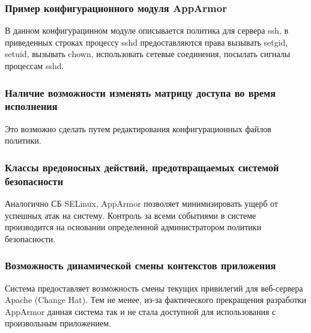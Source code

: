 \subsubsection{Пример конфигурационного модуля AppArmor}


В данном конфигурацинном модуле описывается политика
для сервера ssh, в приведенных строках процессу sshd
предоставляются права вызывать setgid, setuid, вызывать
chown, использовать сетевые соединения, посылать сигналы
процессам sshd.



\subsubsection{Наличие возможности изменять матрицу доступа 
	во время исполнения} 

Это возможно сделать путем редактирования конфигурационных
файлов политики. 


\subsubsection{Классы вредоносных действий, предотвращаемых
	системой безопасности} 

Аналогично СБ SELinux, AppArmor позволяет 
минимизировать ущерб от успешных атак на систему. 
Контроль за всеми событиями в системе производится 
на основании определенной администратором политики 
безопасности. 

\subsubsection{Возможность динамической смены 
контекстов приложения} 

Система предоставляет возможность смены
текущих привилегий для веб-сервера Apache
(Change Hat). Тем не менее, из-за фактического
прекращения разработки AppArmor данная 
система так и не стала доступной для использования
с произвольным приложением. 


